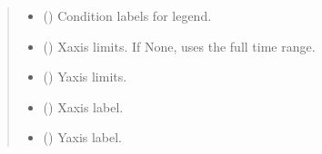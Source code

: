 \documentclass[letterpaper,10pt,english]{sphinxhowto}
\begin{document}
\begin{fulllineitems}
\begin{quote}
\begin{description}
\begin{itemize}
\sphinxAtStartPar
If None, matplotlib tab10 colors are used.


\item {} 
\sphinxAtStartPar
{} (\sphinxstyleliteralemphasis{\sphinxupquote{, }}) \textendash{} Condition labels for legend.

\item {} 
\sphinxAtStartPar
{} (\sphinxstyleliteralemphasis{\sphinxupquote{, }}) \textendash{} X\sphinxhyphen{}axis limits. If None, uses the full time range.

\item {} 
\sphinxAtStartPar
{} (\sphinxstyleliteralemphasis{\sphinxupquote{, }}\sphinxstyleliteralemphasis{\sphinxupquote{(}}\sphinxstyleliteralemphasis{\sphinxupquote{, }}\sphinxstyleliteralemphasis{\sphinxupquote{)}}) \textendash{} Y\sphinxhyphen{}axis limits.

\item {} 
\sphinxAtStartPar
{} (\sphinxstyleliteralemphasis{\sphinxupquote{, }}\sphinxstyleliteralemphasis{\sphinxupquote{ (}}\sphinxstyleliteralemphasis{\sphinxupquote{)}}) \textendash{} X\sphinxhyphen{}axis label.

\item {} 
\sphinxAtStartPar
{} (\sphinxstyleliteralemphasis{\sphinxupquote{, }}) \textendash{} Y\sphinxhyphen{}axis label.


\end{itemize}
\end{description}
\end{quote}
\end{fulllineitems}
\end{document}
